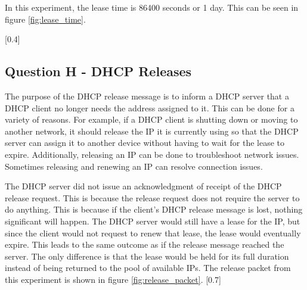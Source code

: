 \documentclass{assignment-x}
\begin{document}
In this experiment, the lease time is 86400 seconds or 1 day. This can be seen in figure \ref{fig:lease_time}. 

[0.4\linewidth]

\subsection{Question H - DHCP Releases}
The purpose of the DHCP release message is to inform a DHCP server that a DHCP client no longer needs the address assigned to it. This can be done for a variety of reasons. For example, if a DHCP client is shutting down or moving to another network, it should release the IP it is currently using so that the DHCP server can assign it to another device without having to wait for the lease to expire. Additionally, releasing an IP can be done to troubleshoot network issues. Sometimes releasing and renewing an IP can resolve connection issues.

The DHCP server did not issue an acknowledgment of receipt of the DHCP release request. This is because the release request does not require the server to do anything. This is because if the client's DHCP release message is lost, nothing significant will happen. The DHCP server would still have a lease for the IP, but since the client would not request to renew that lease, the lease would eventually expire. This leads to the same outcome as if the release message reached the server. The only difference is that the lease would be held for its full duration instead of being returned to the pool of available IPs. The release packet from this experiment is shown in figure \ref{fig:release_packet}.
[0.7\linewidth]
\end{document}
